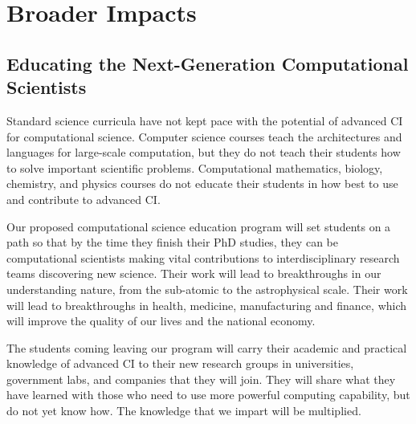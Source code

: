 \documentclass[11pt]{NSFamsart}
\begin{document}
\section{Broader Impacts}

\subsection{Educating the Next-Generation Computational Scientists} 
Standard science curricula have not kept pace with the potential of advanced CI for computational science.  Computer science courses teach the architectures and languages for large-scale computation, but they do not teach their students how to solve important scientific problems.  Computational mathematics, biology, chemistry, and physics courses do not educate their students in how best to use and contribute to advanced CI.

Our proposed computational science education program will set students on a path so that by the time they finish their PhD studies, they can be computational scientists making vital contributions to interdisciplinary research teams discovering new science.  Their work will lead to breakthroughs in our understanding nature, from the sub-atomic to the astrophysical scale.  Their work will lead to breakthroughs in health, medicine,  manufacturing and finance, which will improve the quality of our lives and the national economy. 

The students coming leaving our program will carry their academic and practical knowledge of advanced CI to their new research groups in universities, government labs, and companies that they will join.  They will share what they have learned with those who need to use more powerful computing capability, but do not yet know how.  The knowledge that we impart will be multiplied.
\end{document}
